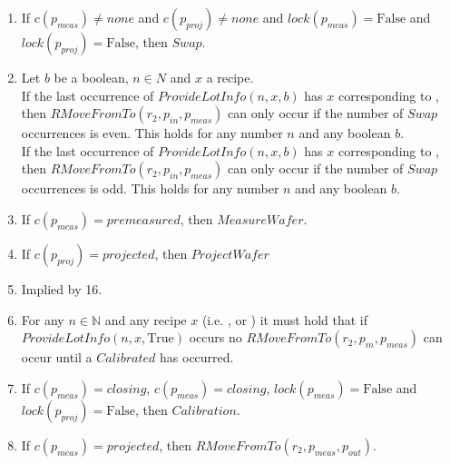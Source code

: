 \begin{enumerate}
    \item If $c(p_\mathit{meas}) \ne \mathit{none}$ and $c(p_\mathit{proj}) \ne \mathit{none}$ and $\mathit{lock}(p_\mathit{meas}) = \text{False}$ and $\mathit{lock}(p_\mathit{proj}) = \text{False}$, then $\mathit{Swap}$.

    \item Let $b$ be a boolean, $n \in N$ and $x$ a recipe. \\
        If the last occurrence of $\mathit{ProvideLotInfo}(n, x, b)$ has $x$ corresponding to \recipeOne, then $\mathit{RMoveFromTo}(r_2,p_\mathit{in},p_\mathit{meas})$ can only occur if the number of $\mathit{Swap}$ occurrences is even.
        This holds for any number $n$ and any boolean $b$. \\
        If the last occurrence of $\mathit{ProvideLotInfo}(n, x, b)$ has $x$ corresponding to \recipeTwo, then $\mathit{RMoveFromTo}(r_2,p_\mathit{in},p_\mathit{meas})$ can only occur if the number of $\mathit{Swap}$ occurrences is odd.
        This holds for any number $n$ and any boolean $b$. \\

    \item If $c(p_\mathit{meas}) = \mathit{premeasured}$, then $\mathit{MeasureWafer}$. %

    \item If $c(p_\mathit{proj}) = \mathit{projected}$, then $\mathit{ProjectWafer}$ %

    \item Implied by 16. %

    \item For any $n \in \mathbb{N}$ and any recipe $x$ (i.e. \recipeOne, \recipeTwo or \recipeThree) it must hold that if $\mathit{ProvideLotInfo}(n, x, \text{True})$ occurs no $\mathit{RMoveFromTo}(r_2, p_\mathit{in}, p_\mathit{meas})$ can occur until a $\mathit{Calibrated}$ has occurred.

    \item If $c(p_\mathit{meas}) = \mathit{closing}$, $c(p_\mathit{meas}) = \mathit{closing}$, $\mathit{lock}(p_\mathit{meas}) = \text{False}$ and $\mathit{lock}(p_\mathit{proj}) = \text{False}$, then $\mathit{Calibration}$.

    \item If $c(p_\mathit{meas}) = \mathit{projected}$, then $\mathit{RMoveFromTo}\left(r_2, p_\mathit{meas}, p_\mathit{out}\right)$.
\end{enumerate}
